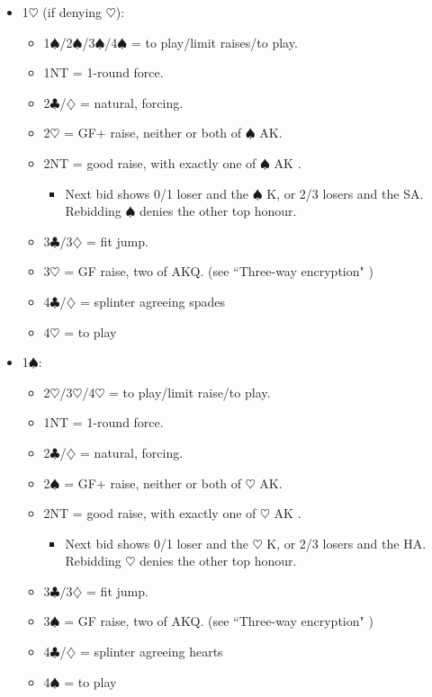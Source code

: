 \documentclass[a4paper,14pt]{extarticle}
\begin{document}
\begin{itemize}
\item 1$\heartsuit$ (if denying $\heartsuit$):
	\begin{itemize}
   \item 1$\spadesuit$/2$\spadesuit$/3$\spadesuit$/4$\spadesuit$ = to play/limit raises/to play.
   \item 1NT = 1-round force.
   \item 2$\clubsuit$/$\diamondsuit$ = natural, forcing.
   \item 2$\heartsuit$ = GF+ raise, neither or both of $\spadesuit$ AK.
   \item 2NT = good raise, with exactly one of $\spadesuit$ AK .
		\begin{itemize}
      \item Next bid shows 0/1 loser and the $\spadesuit$ K, or 2/3 losers and the SA.
         Rebidding $\spadesuit$ denies the other top honour.
		\end{itemize}
   \item 3$\clubsuit$/3$\diamondsuit$ = fit jump.
   \item 3$\heartsuit$ = GF raise, two of AKQ. (see ``Three-way encryption" )
   \item 4$\clubsuit$/$\diamondsuit$ = splinter agreeing spades
	\item 4$\heartsuit$ = to play
	\end{itemize}


\item 1$\spadesuit$:
	\begin{itemize}
   \item 2$\heartsuit$/3$\heartsuit$/4$\heartsuit$ = to play/limit raise/to play.
   \item 1NT = 1-round force.
   \item 2$\clubsuit$/$\diamondsuit$ = natural, forcing.
   \item 2$\spadesuit$ = GF+ raise, neither or both of $\heartsuit$ AK.
   \item 2NT = good raise, with exactly one of $\heartsuit$ AK .
		\begin{itemize}
      \item Next bid shows 0/1 loser and the $\heartsuit$ K, or 2/3 losers and the HA.
         Rebidding $\heartsuit$ denies the other top honour.
		\end{itemize}
   \item 3$\clubsuit$/3$\diamondsuit$ = fit jump.
   \item 3$\spadesuit$ = GF raise, two of AKQ. (see ``Three-way encryption" )
   \item 4$\clubsuit$/$\diamondsuit$ = splinter agreeing hearts
   \item 4$\spadesuit$ = to play
	\end{itemize}


\end{itemize}
\end{document}
